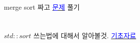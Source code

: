 \documentclass{oblivoir}
\begin{document}
    \section{}
    merge sort 짜고 \href{https://www.acmicpc.net/problem/2751}{\textcolor{blue}{문제}} 풀기

    \section{}    
	$std::sort$ 쓰는법에 대해서 알아볼것.
	\href{https://www.acmicpc.net/blog/view/22}{\textcolor{blue}{기초자료}}
\end{document}
